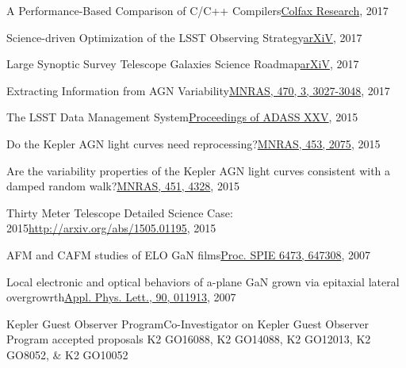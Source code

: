 \documentclass[10pt,a4paper]{article}
\begin{document}
\spacedhrule{2.0em}{0.2em}





\inlineheadsection
  {A Performance-Based Comparison of C/C++ Compilers}{\href{https://colfaxresearch.com/compiler-comparison/}{Colfax Research}, 2017}

\inlineheadsection
  {Science-driven Optimization of the LSST Observing Strategy}{\href{https://arxiv.org/abs/1708.04058}{arXiV}, 2017}

\inlineheadsection
  {Large Synoptic Survey Telescope Galaxies Science Roadmap}{\href{https://arxiv.org/abs/1708.01617}{arXiV}, 2017}

\inlineheadsection
  {Extracting Information from AGN Variability}{\href{https://doi.org/10.1093/mnras/stx1420}{MNRAS, 470, 3, 3027-3048}, 2017}

\inlineheadsection
  {The LSST Data Management System}{\href{http://adsabs.harvard.edu/cgi-bin/bib_query?arXiv:1512.07914}{Proceedings of ADASS XXV}, 2015}

\inlineheadsection
  {Do the Kepler AGN light curves need reprocessing?}{\href{http://dx.doi.org/10.1093/mnras/stv1797}{MNRAS, 453, 2075}, 2015}

\inlineheadsection
  {Are the variability properties of the Kepler AGN light curves consistent with a damped random walk?}{\href{http://dx.doi.org/ 10.1093/mnras/stv1230}{MNRAS, 451, 4328}, 2015}

\inlineheadsection
 {Thirty Meter Telescope Detailed Science Case: 2015}{\href{http://arxiv.org/abs/1505.01195}{http://arxiv.org/abs/1505.01195}, 2015}

\inlineheadsection
  {AFM and CAFM studies of ELO GaN films}{\href{http://dx.doi.org/10.1117/12.706773}{Proc. SPIE 6473, 647308}, 2007}

\inlineheadsection
  {Local electronic and optical behaviors of a-plane GaN grown via epitaxial lateral overgrowrth}{\href{http://dx.doi.org/10.1063/1.2429901}{Appl. Phys. Lett., 90, 011913}, 2007}




\inlineheadsection
  {Kepler Guest Observer Program}{Co-Investigator on Kepler Guest Observer Program accepted proposals K2 GO16088, K2 GO14088, K2 GO12013, K2 GO8052, \& K2 GO10052}
\end{document}
